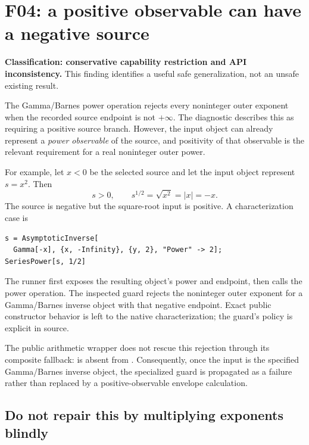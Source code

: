\section{F04: a positive observable can have a negative source}\label{sec:f04}

\textbf{Classification: conservative capability restriction and API inconsistency.} This finding identifies a useful safe generalization, not an unsafe existing result.


The Gamma/Barnes power operation rejects every noninteger outer exponent when the recorded source endpoint is not $+\infty$. The diagnostic describes this as requiring a positive source branch. However, the input object can already represent a \emph{power observable} of the source, and positivity of that observable is the relevant requirement for a real noninteger outer power.

For example, let $x<0$ be the selected source and let the input object represent $s=x^2$. Then
\[
 s>0,\qquad s^{1/2}=\sqrt{x^2}=|x|=-x.
\]
The source is negative but the square-root input is positive. A characterization case is
\begin{lstlisting}
s = AsymptoticInverse[
  Gamma[-x], {x, -Infinity}, {y, 2}, "Power" -> 2];
SeriesPower[s, 1/2]
\end{lstlisting}
The runner first exposes the resulting object's power and endpoint, then calls the power operation. The inspected guard rejects the noninteger outer exponent for a Gamma/Barnes inverse object with that negative endpoint. Exact public constructor behavior is left to the native characterization; the guard's policy is explicit in source.\cite{gamma,gammaops}

The public arithmetic wrapper does not rescue this rejection through its composite fallback:  is absent from . Consequently, once the input is the specified Gamma/Barnes inverse object, the specialized guard is propagated as a failure rather than replaced by a positive-observable envelope calculation.\cite{arithmetic,seriesops,gammaops}

\subsection{Do not repair this by multiplying exponents blindly}

